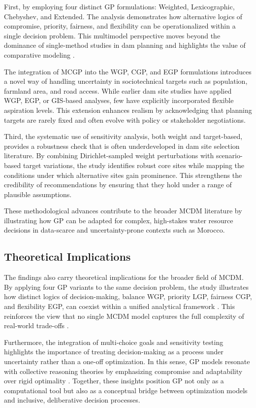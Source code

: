 First, by employing four distinct \gls{GP} formulations: Weighted, Lexicographic, Chebyshev, and Extended. The analysis demonstrates how alternative logics of compromise, priority, fairness, and flexibility can be operationalized within a single decision problem. This multimodel perspective moves beyond the dominance of single-method studies in dam planning and highlights the value of comparative modeling \cite{Belton2002,Aruldoss2013}.  

The integration of \gls{MCGP} into the \gls{WGP}, \gls{CGP}, and \gls{EGP} formulations introduces a novel way of handling uncertainty in sociotechnical targets such as population, farmland area, and road access. While earlier dam site studies have applied \gls{WGP}, \gls{EGP}, or GIS-based analyses, few have explicitly incorporated flexible aspiration levels. This extension enhances realism by acknowledging that planning targets are rarely fixed and often evolve with policy or stakeholder negotiations.  

Third, the systematic use of sensitivity analysis, both weight and target-based, provides a robustness check that is often underdeveloped in dam site selection literature. By combining Dirichlet-sampled weight perturbations with scenario-based target variations, the study identifies robust core sites while mapping the conditions under which alternative sites gain prominence. This strengthens the credibility of recommendations by ensuring that they hold under a range of plausible assumptions.  

These methodological advances contribute to the broader \gls{MCDM} literature by illustrating how GP can be adapted for complex, high-stakes water resource decisions in data-scarce and uncertainty-prone contexts such as Morocco.

\subsection{Theoretical Implications}
The findings also carry theoretical implications for the broader field of \gls{MCDM}.  
By applying four \gls{GP} variants to the same decision problem, the study illustrates how distinct logics of decision-making, balance \gls{WGP}, priority \gls{LGP}, fairness \gls{CGP}, and flexibility \gls{EGP}, can coexist within a unified analytical framework \cite{jones2010}. This reinforces the view that no single \gls{MCDM} model captures the full complexity of real-world trade-offs \cite{KUMAR2017596,Aruldoss2013}.

Furthermore, the integration of multi-choice goals and sensitivity testing highlights the importance of treating decision-making as a process under uncertainty rather than a one-off optimization. In this sense, GP models resonate with collective reasoning theories by emphasizing compromise and adaptability over rigid optimality \cite{Borges2020}. Together, these insights position GP not only as a computational tool but also as a conceptual bridge between optimization models and inclusive, deliberative decision processes.

